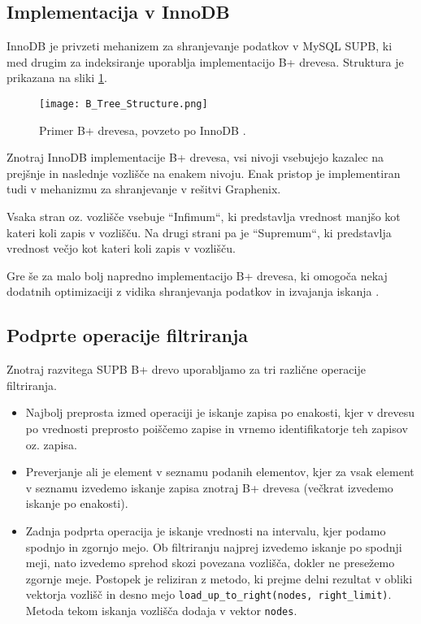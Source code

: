 \documentclass[a4paper,12pt,openright]{book}
\begin{document}
        \subsection{Implementacija v InnoDB}
        \label{MYSQL_BPTREE}

        InnoDB je privzeti mehanizem za shranjevanje podatkov v MySQL SUPB, ki med drugim za indeksiranje uporablja implementacijo B+ drevesa. Struktura je prikazana na sliki \ref{btree_innodb}.

        \begin{figure}[H]
            \centerline{\texttt{[image: B\_Tree\_Structure.png]}}
            \caption{Primer B+ drevesa, povzeto po InnoDB \cite{BPTREE_INNODB}.}
            \label{btree_innodb}
        \end{figure}

        \noindent
        Znotraj InnoDB implementacije B+ drevesa, vsi nivoji vsebujejo kazalec na prejšnje in naslednje vozlišče na enakem nivoju. Enak pristop je implementiran tudi v mehanizmu za shranjevanje v rešitvi Graphenix. 
        
        Vsaka stran oz. vozlišče vsebuje ``Infimum``, ki predstavlja vrednost manjšo kot kateri koli zapis v vozlišču. Na drugi strani pa je ``Supremum``, ki predstavlja vrednost večjo kot kateri koli zapis v vozlišču.

        Gre še za malo bolj napredno implementacijo B+ drevesa, ki omogoča nekaj dodatnih optimizaciji z vidika shranjevanja podatkov in izvajanja iskanja \cite{BPTREE_INNODB}.
        
        \subsection{Podprte operacije filtriranja}
        
        Znotraj razvitega SUPB B+ drevo uporabljamo za tri različne operacije filtriranja.
        \begin{itemize}
            \item Najbolj preprosta izmed operaciji je iskanje zapisa po enakosti, kjer v drevesu po vrednosti preprosto poiščemo zapise in vrnemo identifikatorje teh zapisov oz. zapisa.
            \item Preverjanje ali je element v seznamu podanih elementov, kjer za vsak element v seznamu izvedemo iskanje zapisa znotraj B+ drevesa (večkrat izvedemo iskanje po enakosti).
            \item Zadnja podprta operacija je iskanje vrednosti na intervalu, kjer podamo spodnjo in zgornjo mejo. Ob filtriranju najprej izvedemo iskanje po spodnji meji, nato izvedemo sprehod skozi povezana vozlišča, dokler ne presežemo zgornje meje. Postopek je reliziran z metodo, ki prejme delni rezultat v obliki vektorja vozlišč in desno mejo {\tt load\_up\_to\_right(nodes, right\_limit)}. Metoda tekom iskanja vozlišča dodaja v vektor {\tt nodes}.
        \end{itemize}
\end{document}
